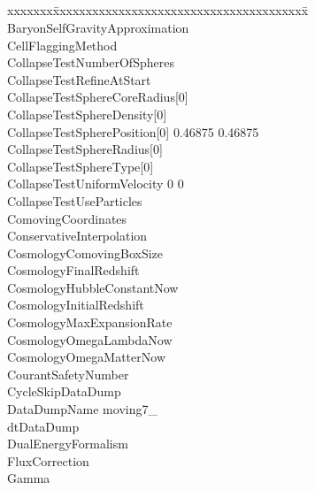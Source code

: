\documentclass{book}
\begin{document}
\subsection{\enzo}

{\parametersize
\begin{tabbing}
xxxxxxx\=xxxxxxxxxxxxxxxxxxxxxxxxxxxxxxxxxxxxxxx\=\kill
\> BaryonSelfGravityApproximation  \\
\> CellFlaggingMethod             \\
\> CollapseTestNumberOfSpheres  \\
\> CollapseTestRefineAtStart    \\
\> CollapseTestSphereCoreRadius[0]  \\
\> CollapseTestSphereDensity[0]     \\
\> CollapseTestSpherePosition[0]    0.46875 0.46875 \\
\> CollapseTestSphereRadius[0]      \\
\> CollapseTestSphereType[0]        \\
\> CollapseTestUniformVelocity      0 0 \\
\> CollapseTestUseParticles     \\
\> ComovingCoordinates                \\
\> ConservativeInterpolation    \\
\> CosmologyComovingBoxSize         \\
\> CosmologyFinalRedshift             \\
\> CosmologyHubbleConstantNow       \\
\> CosmologyInitialRedshift          \\
\> CosmologyMaxExpansionRate      \\
\> CosmologyOmegaLambdaNow     \\
\> CosmologyOmegaMatterNow     \\
\> CourantSafetyNumber          \\
\> CycleSkipDataDump       \\
\> DataDumpName           \> moving7\_ \\
\> dtDataDump              \\
\> DualEnergyFormalism                 \\
\> FluxCorrection               \\
\> Gamma                        \\

\end{tabbing}}
\end{document}
